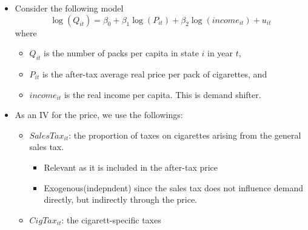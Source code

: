 \documentclass[]{book}
\newenvironment{Shaded}{\begin{snugshade}}{\end{snugshade}}
\newcommand{\KeywordTok}[1]{\textcolor[rgb]{0.13,0.29,0.53}{\textbf{#1}}}
\newcommand{\DataTypeTok}[1]{\textcolor[rgb]{0.13,0.29,0.53}{#1}}
\newcommand{\StringTok}[1]{\textcolor[rgb]{0.31,0.60,0.02}{#1}}
\newcommand{\OperatorTok}[1]{\textcolor[rgb]{0.81,0.36,0.00}{\textbf{#1}}}
\newcommand{\NormalTok}[1]{#1}
\providecommand{\tightlist}{%
  \setlength{\itemsep}{0pt}\setlength{\parskip}{0pt}}
\begin{document}
\begin{itemize}
\tightlist
\item
  Consider the following model \[
  \log (Q_{it}) = \beta_0 + \beta_1 \log (P_{it}) + \beta_2 \log(income_{it}) + u_{it}
  \] where

  \begin{itemize}
  \tightlist
  \item
    \(Q_{it}\) is the number of packs per capita in state \(i\) in year
    \(t\),
  \item
    \(P_{it}\) is the after-tax average real price per pack of
    cigarettes, and
  \item
    \(income_{it}\) is the real income per capita. This is demand
    shifter.
  \end{itemize}
\item
  As an IV for the price, we use the followings:

  \begin{itemize}
  \tightlist
  \item
    \(SalesTax_{it}\): the proportion of taxes on cigarettes arising
    from the general sales tax.

    \begin{itemize}
    \tightlist
    \item
      Relevant as it is included in the after-tax price
    \item
      Exogenous(indepndent) since the sales tax does not influence
      demand directly, but indirectly through the price.
    \end{itemize}
  \item
    \(CigTax_{it}\): the cigarett-specific taxes
  \end{itemize}
\end{itemize}

\begin{Shaded}
\end{Shaded}
\end{document}

